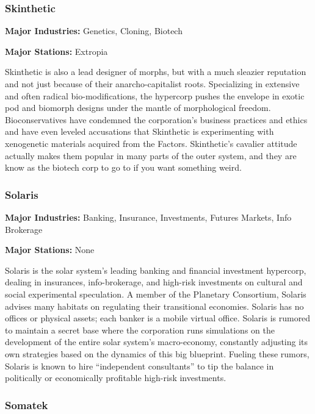 \subsubsection{Skinthetic}
\label{sec:skinthetic}

\textbf{Major Industries:} Genetics, Cloning, Biotech

\textbf{Major Stations:} Extropia


Skinthetic is also a lead designer of morphs, but with a much sleazier
reputation and not just because of their anarcho-capitalist
roots. Specializing in extensive and often radical bio-modifications,
the hypercorp pushes the envelope in exotic pod and biomorph designs
under the mantle of morphological freedom.  Bioconservatives have
condemned the corporation's business practices and ethics and have
even leveled accusations that Skinthetic is experimenting with
xenogenetic materials acquired from the Factors.  Skinthetic's
cavalier attitude actually makes them popular in many parts of the
outer system, and they are know as the biotech corp to go to if you
want something weird.

\subsubsection{Solaris}
\label{sec:solaris}

\textbf{Major Industries:} Banking, Insurance, Investments, Futures Markets, Info Brokerage

\textbf{Major Stations:} None


Solaris is the solar system's leading banking and financial investment
hypercorp, dealing in insurances, info-brokerage, and high-risk
investments on cultural and social experimental speculation. A member
of the Planetary Consortium, Solaris advises many habitats on
regulating their transitional economies. Solaris has no offices or
physical assets; each banker is a mobile virtual office. Solaris is
rumored to maintain a secret base where the corporation runs
simulations on the development of the entire solar system's
macro-economy, constantly adjusting its own strategies based on the
dynamics of this big blueprint. Fueling these rumors, Solaris is known
to hire “independent consultants” to tip the balance in politically or
economically profitable high-risk investments.

\subsubsection{Somatek}
\label{sec:somatek}


